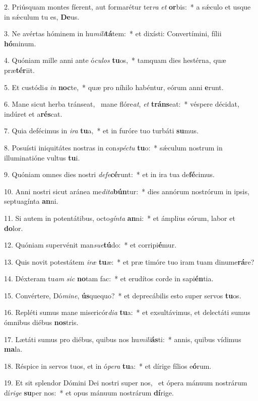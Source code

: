 2. Priúsquam montes fíerent, aut formarétur ter\textit{ra} \textit{et} \textbf{or}bis:~*  a sǽculo et usque in sǽculum tu es, \textbf{De}us.\

3. Ne avértas hóminem in hu\textit{mi}\textit{li}\textbf{tá}tem:~*  et dixísti: Convertímini, fílii \textbf{hó}minum.\

4. Quóniam mille anni ante ó\textit{cu}\textit{los} \textbf{tu}os,~*  tamquam dies hestérna, quæ præ\textbf{tér}iit.\

5. Et custódi\textit{a} \textit{in} \textbf{noc}te,~*  quæ pro níhilo habéntur, eórum anni \textbf{e}runt.\

6. Mane sicut herba tránseat, \dag\  mane flóre\textit{at}, \textit{et} \textbf{tráns}eat:~*  véspere décidat, indúret et a\textbf{rés}cat.\

7. Quia defécimus in \textit{i}\textit{ra} \textbf{tu}a,~*  et in furóre tuo turbáti \textbf{su}mus.\

8. Posuísti iniquitátes nostras in con\textit{spéc}\textit{tu} \textbf{tu}o:~*  sǽculum nostrum in illuminatióne vultus \textbf{tu}i.\

9. Quóniam omnes dies nostri \textit{de}\textit{fe}\textbf{cé}runt:~*  et in ira tua de\textbf{fé}cimus.\

10. Anni nostri sicut aránea me\textit{di}\textit{ta}\textbf{bún}tur:~*  dies annórum nostrórum in ipsis, septuagínta \textbf{an}ni.\

11. Si autem in potentátibus, octo\textit{gín}\textit{ta} \textbf{an}ni:~*  et ámplius eórum, labor et \textbf{do}lor.\

12. Quóniam supervénit man\textit{su}\textit{e}\textbf{tú}do:~*  et corripi\textbf{é}mur.\

13. Quis novit potestátem \textit{i}\textit{ræ} \textbf{tu}æ:~*  et præ timóre tuo iram tuam dinume\textbf{rá}re?\

14. Déxteram tu\textit{am} \textit{sic} \textbf{no}tam fac:~*  et erudítos corde in sapi\textbf{én}tia.\

15. Convértere, Dó\textit{mi}\textit{ne}, \textbf{ús}quequo?~*  et deprecábilis esto super servos \textbf{tu}os.\

16. Repléti sumus mane misericór\textit{di}\textit{a} \textbf{tu}a:~*  et exsultávimus, et delectáti sumus ómnibus diébus \textbf{nos}tris.\

17. Lætáti sumus pro diébus, quibus nos hu\textit{mi}\textit{li}\textbf{ás}ti:~*  annis, quibus vídimus \textbf{ma}la.\

18. Réspice in servos tuos, et in ó\textit{pe}\textit{ra} \textbf{tu}a:~*  et dírige fílios e\textbf{ó}rum.\

19. Et sit splendor Dómini Dei nostri super nos, \dag\  et ópera mánuum nostrárum dí\textit{ri}\textit{ge} \textbf{su}per nos:~*  et opus mánuum nostrárum \textbf{dí}rige.\

